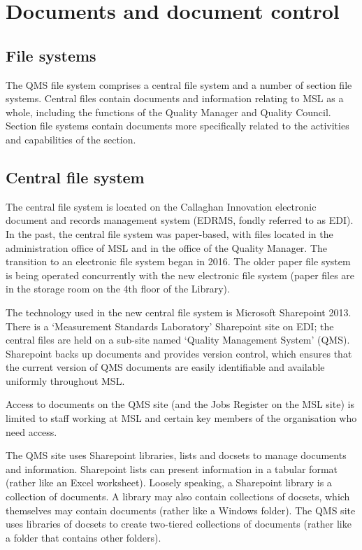 \section{Documents and document control}
\label{s:documents_and_document_control}
\subsection{File systems}
The QMS file system comprises a central file system and a number of section file systems. Central files contain documents and information relating to MSL as a whole, including the functions of the Quality Manager and Quality Council.  Section file systems contain documents more specifically related to the activities and capabilities of the section.

\subsection{Central file system}
\label{ss:central_file_system}
The central file system is located on the Callaghan Innovation electronic document and records management system (EDRMS, fondly referred to as EDI). In the past, the central file system was paper-based, with files located in the administration office of MSL and in the office of the Quality Manager. The transition to an electronic file system began in 2016. The older paper file system is being operated concurrently with the new electronic file system (paper files are in the storage room on the 4th floor of the Library).

The technology used in the new central file system is Microsoft Sharepoint 2013. There is a ‘Measurement Standards Laboratory’ Sharepoint site on EDI; the central files are held on a sub-site named ‘Quality Management System’ (QMS). 
Sharepoint backs up documents and provides version control, which ensures that the current version of QMS documents are easily identifiable and available uniformly throughout MSL.

Access to documents on the QMS site (and the Jobs Register on the MSL site) is limited to staff working at MSL and certain key members of the organisation who need access. 

The QMS site uses Sharepoint libraries, lists and docsets to manage documents and information. Sharepoint lists can present information in a tabular format (rather like an Excel worksheet). Loosely speaking, a Sharepoint library is a collection of documents. A library may also contain collections of docsets, which themselves may contain documents (rather like a Windows folder). The QMS site uses libraries of docsets to create two-tiered collections of documents (rather like a folder that contains other folders). 

